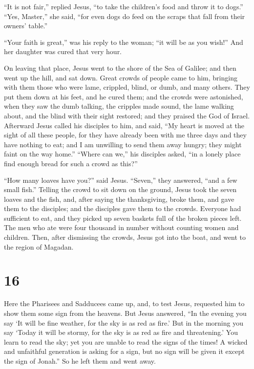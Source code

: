  ``It is not fair,'' replied Jesus, ``to take the
children's food and throw it to dogs.''  ``Yes, Master,''
she said, ``for even dogs do feed on the scraps that fall from their
owners' table.''

 ``Your faith is great,'' was his reply to the woman; ``it
will be as you wish!'' And her daughter was cured that very hour.

 On leaving that place, Jesus went to the shore of the Sea
of Galilee; and then went up the hill, and sat down.  Great
crowds of people came to him, bringing with them those who were lame,
crippled, blind, or dumb, and many others. They put them down at his
feet, and he cured them;  and the crowds were astonished,
when they saw the dumb talking, the cripples made sound, the lame
walking about, and the blind with their sight restored; and they praised
the God of Israel.  Afterward Jesus called his disciples to
him, and said, ``My heart is moved at the sight of all these people, for
they have already been with me three days and they have nothing to eat;
and I am unwilling to send them away hungry; they might faint on the way
home.''  ``Where can we,'' his disciples asked, ``in a
lonely place find enough bread for such a crowd as this?''

 ``How many loaves have you?'' said Jesus. ``Seven,'' they
answered, ``and a few small fish.''  Telling the crowd to
sit down on the ground,  Jesus took the seven loaves and
the fish, and, after saying the thanksgiving, broke them, and gave them
to the disciples; and the disciples gave them to the crowds.
 Everyone had sufficient to eat, and they picked up seven
baskets full of the broken pieces left.  The men who ate
were four thousand in number without counting women and children.
 Then, after dismissing the crowds, Jesus got into the
boat, and went to the region of Magadan.

\hypertarget{section-15}{%
\section{16}\label{section-15}}

 Here the Pharisees and Sadducees came up, and, to test
Jesus, requested him to show them some sign from the heavens.
 But Jesus answered, ``In the evening you say `It will be
fine weather, for the sky is as red as fire.'  But in the
morning you say `Today it will be stormy, for the sky is as red as fire
and threatening.' You learn to read the sky; yet you are unable to read
the signs of the times!  A wicked and unfaithful generation
is asking for a sign, but no sign will be given it except the sign of
Jonah.'' So he left them and went away.

